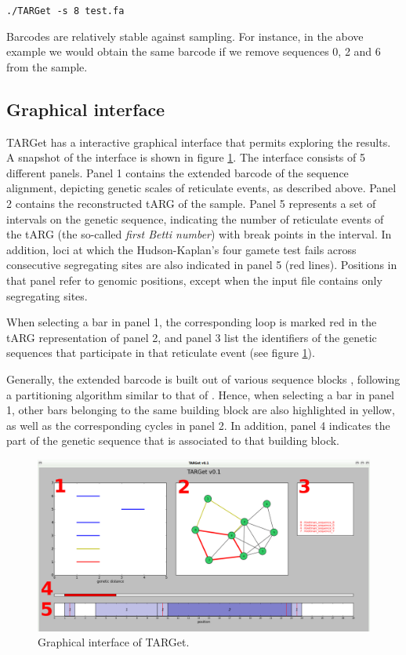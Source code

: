 \documentclass[12pt]{article}
\begin{document}
\texttt{./TARGet -s 8 test.fa}

\noindent Barcodes are relatively stable against sampling. For instance, in the above example we would obtain the same barcode if we remove sequences 0, 2 and 6 from the sample. 

\subsection*{Graphical interface}

TARGet has a interactive graphical interface that permits exploring the results. A snapshot of the interface is shown in figure \ref{fig2}. The interface consists of 5 different panels. Panel 1 contains the extended barcode of the sequence alignment, depicting genetic scales of reticulate events, as described above. Panel 2 contains the reconstructed tARG of the sample. Panel 5 represents a set of intervals on the genetic sequence, indicating the number of reticulate events of the tARG (the so-called \emph{first Betti number}) with break points in the interval. In addition, loci at which the Hudson-Kaplan's four gamete test \cite{hk} fails across consecutive segregating sites are also indicated in panel 5 (red lines). Positions in that panel refer to genomic positions, except when the input file contains only segregating sites. 

When selecting a bar in panel 1, the corresponding loop is marked red in the tARG representation of panel 2, and panel 3 list the identifiers of the genetic sequences that participate in that reticulate event (see figure \ref{fig2}). 

Generally, the extended barcode is built out of various sequence blocks \cite{target}, following a partitioning algorithm similar to that of \cite{mg}. Hence, when selecting a bar in panel 1, other bars belonging to the same building block are also highlighted in yellow, as well as the corresponding cycles in panel 2. In addition, panel 4 indicates the part of the genetic sequence that is associated to that building block.

\begin{figure}[!ht]
\centering
\includegraphics[width=15.cm, angle=0]{Screenshot.png}
\caption{Graphical interface of TARGet.
\label{fig2}}
\end{figure} 
\end{document}
